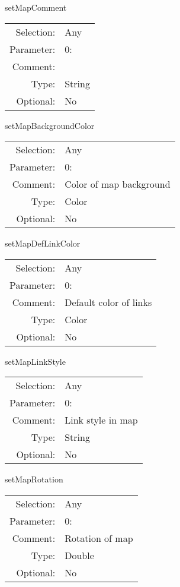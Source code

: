 \item setMapComment\\
\begin{tabular}{rl}
  Selection: & Any\\
   Parameter: &  0:\\
        Comment: & \\
           Type: & String\\
       Optional: &  No\\
\end{tabular}

\item setMapBackgroundColor\\
\begin{tabular}{rl}
  Selection: & Any\\
   Parameter: &  0:\\
        Comment: & Color of map background\\
           Type: & Color\\
       Optional: &  No\\
\end{tabular}

\item setMapDefLinkColor\\
\begin{tabular}{rl}
  Selection: & Any\\
   Parameter: &  0:\\
        Comment: & Default color of links\\
           Type: & Color\\
       Optional: &  No\\
\end{tabular}

\item setMapLinkStyle\\
\begin{tabular}{rl}
  Selection: & Any\\
   Parameter: &  0:\\
        Comment: & Link style in map\\
           Type: & String\\
       Optional: &  No\\
\end{tabular}

\item setMapRotation\\
\begin{tabular}{rl}
  Selection: & Any\\
   Parameter: &  0:\\
        Comment: & Rotation of map\\
           Type: & Double\\
       Optional: &  No\\
\end{tabular}

